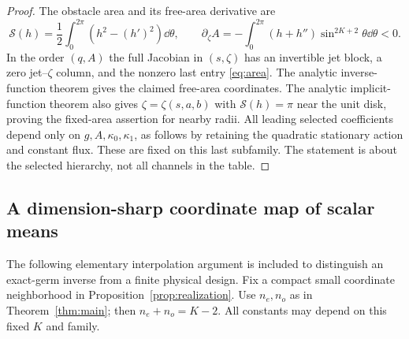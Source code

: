 \begin{proof}
The obstacle area and its free-area derivative are
\begin{equation}\label{eq:area}
 \mathcal S(h)=\frac12\int_0^{2\pi}(h^2-(h')^2)\dd\theta,
 \qquad
 \partial_\zeta A=-\int_0^{2\pi}(h+h'')\sin^{2K+2}\theta
                                      \dd\theta<0.
\end{equation}
In the order $(q,A)$ the full Jacobian in $(s,\zeta)$ has an
invertible jet block, a zero jet--$\zeta$ column, and the nonzero
last entry \eqref{eq:area}. The analytic inverse-function theorem
gives the claimed free-area coordinates. The analytic implicit-function
theorem also gives $\zeta=\zeta(s,a,b)$ with $\mathcal S(h)=\pi$
near the unit disk, proving the fixed-area assertion for nearby radii.
All leading selected coefficients depend only on $g,A,\kappa_0,\kappa_1$,
as follows by retaining the quadratic stationary action and constant
flux. These are fixed on this last subfamily. The statement is about
the selected hierarchy, not all channels in the table.
\end{proof}

\subsection{A dimension-sharp coordinate map of scalar means}
The following elementary interpolation argument is included to distinguish
an exact-germ inverse from a finite physical design. Fix a compact small
coordinate neighborhood in Proposition~\ref{prop:realization}.
Use $n_e,n_o$ as in Theorem~\ref{thm:main}; then
$n_e+n_o=K-2$. All constants may depend on this fixed $K$ and family.

